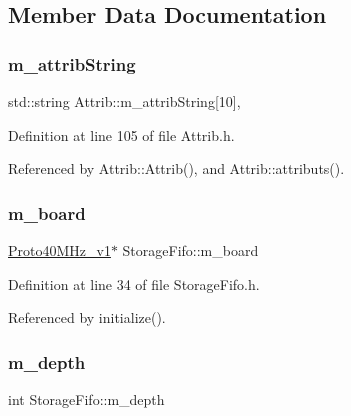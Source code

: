 \subsection{Member Data Documentation}
\mbox{\label{classAttrib_a3414521d7a82476e874b25a5407b5e63}} 
\subsubsection{\texorpdfstring{m\+\_\+attrib\+String}{m\_attribString}}
{\footnotesize\ttfamily std\+::string Attrib\+::m\+\_\+attrib\+String\mbox{[}10\mbox{]}\hspace{0.3cm}{\ttfamily [protected]}, {\ttfamily [inherited]}}



Definition at line 105 of file Attrib.\+h.



Referenced by Attrib\+::\+Attrib(), and Attrib\+::attributs().

\mbox{\label{classStorageFifo_adca2141575d4994ef13e3dabe2e06c52}} 
\subsubsection{\texorpdfstring{m\+\_\+board}{m\_board}}
{\footnotesize\ttfamily \hyperlink{classProto40MHz__v1}{Proto40\+M\+Hz\+\_\+v1}$\ast$ Storage\+Fifo\+::m\+\_\+board\hspace{0.3cm}{\ttfamily [private]}}



Definition at line 34 of file Storage\+Fifo.\+h.



Referenced by initialize().

\mbox{\label{classStorageFifo_a4312878a2a96e6a306be9e5fd99064d5}} 
\subsubsection{\texorpdfstring{m\+\_\+depth}{m\_depth}}
{\footnotesize\ttfamily int Storage\+Fifo\+::m\+\_\+depth\hspace{0.3cm}{\ttfamily [private]}}



